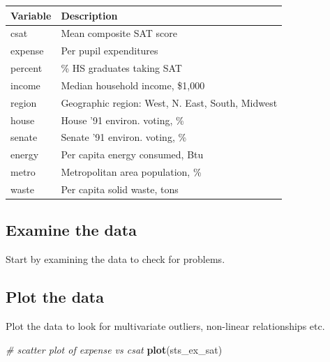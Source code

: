 \documentclass[
]{book}
\newenvironment{Shaded}{\begin{snugshade}}{\end{snugshade}}
\newcommand{\CommentTok}[1]{\textcolor[rgb]{0.56,0.35,0.01}{\textit{#1}}}
\newcommand{\DataTypeTok}[1]{\textcolor[rgb]{0.13,0.29,0.53}{#1}}
\newcommand{\KeywordTok}[1]{\textcolor[rgb]{0.13,0.29,0.53}{\textbf{#1}}}
\newcommand{\NormalTok}[1]{#1}
\newcommand{\OperatorTok}[1]{\textcolor[rgb]{0.81,0.36,0.00}{\textbf{#1}}}
\newcommand{\StringTok}[1]{\textcolor[rgb]{0.31,0.60,0.02}{#1}}
\begin{document}
\begin{longtable}[]{@{}ll@{}}
\toprule
Variable & Description\tabularnewline
\midrule
\endhead
csat & Mean composite SAT score\tabularnewline
expense & Per pupil expenditures\tabularnewline
percent & \% HS graduates taking SAT\tabularnewline
income & Median household income, \$1,000\tabularnewline
region & Geographic region: West, N. East, South, Midwest\tabularnewline
house & House '91 environ. voting, \%\tabularnewline
senate & Senate '91 environ. voting, \%\tabularnewline
energy & Per capita energy consumed, Btu\tabularnewline
metro & Metropolitan area population, \%\tabularnewline
waste & Per capita solid waste, tons\tabularnewline
\bottomrule
\end{longtable}

\hypertarget{examine-the-data}{%
\subsection{Examine the data}\label{examine-the-data}}

Start by examining the data to check for problems.

\begin{Shaded}
\end{Shaded}

\hypertarget{plot-the-data}{%
\subsection{Plot the data}\label{plot-the-data}}

Plot the data to look for multivariate outliers, non-linear relationships etc.

\begin{Shaded}
\begin{Highlighting}[]
  \CommentTok{# scatter plot of expense vs csat}
  \KeywordTok{plot}\NormalTok{(sts_ex_sat)}
\end{Highlighting}
\end{Shaded}
\end{document}
